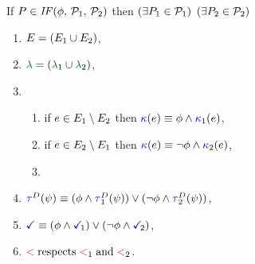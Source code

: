 \begin{figure}
  \noindent
  If $\aPS \in \sIF{\aForm}\sTHEN\aPSS_1\sELSE\aPSS_2\sFI$ then
  $(\exists P_1\in\mathcal{P}_1)$ $(\exists P_2\in\mathcal{P}_2)$
  \begin{multicols}{2}
    \begin{enumerate}[topsep=0pt,label=(\textsc{i}\arabic*),ref=\textsc{i}\arabic*]
    \item \label{if-E}
      $E = (E_1\cup E_2)$,
    \item \label{if-lambda}
      ${\labeling}=\PBR{{\labeling_1}\cup {\labeling_2}}$, 
    \item[] 
      \begin{enumerate}[leftmargin=0pt]
      \item \label{if-kappa1}
        if $e\in E_1\setminus E_2$ then ${\color{blue}\kappa}(e) \mathrel{\equiv} \phi\land{\color{blue}\kappa}_1(e)$,
      \item \label{if-kappa2}
        if $e\in E_2\setminus E_1$ then ${\color{blue}\kappa}(e) \mathrel{\equiv} \neg\phi\land{\color{blue}\kappa}_2(e)$, 
      \item \label{if-kappa12}
      \end{enumerate}
      \columnbreak
    \item \label{if-tau}
      $\aTr{\bEvs}{\bForm} \riff (\aForm\land\aTr[1]{\bEvs}{\bForm})\lor(\neg\aForm\land\aTr[2]{\bEvs}{\bForm})$,
    \item \label{if-term}
      $\aTerm \riff (\aForm\land\aTerm[1])\lor(\neg\aForm\land\aTerm[2])$,
    \item \label{if-le}
      ${\lt}\rextends{\lt_1}{\lt_2}$.
    \end{enumerate}
  \end{multicols}
  \medskip


\end{figure}
